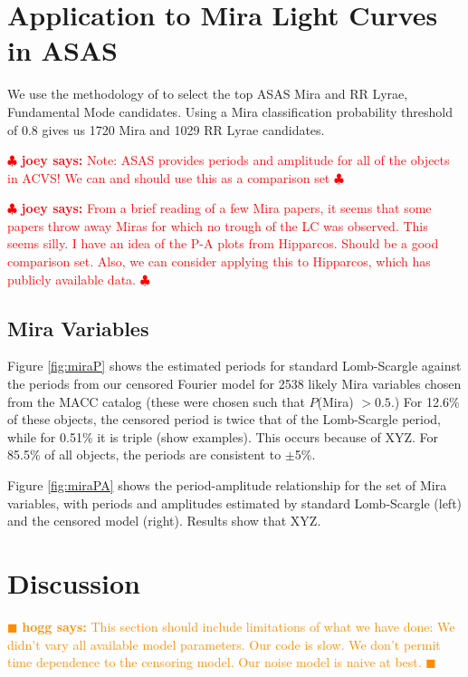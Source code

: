 \documentclass[12pt,preprint]{aastex}
\newcommand{\hogg}[1] { \textcolor{darkorange} {
\ensuremath{\blacksquare} {\bf hogg says:}  {#1}
\ensuremath{\blacksquare} } }
\newcommand{\joey}[1] { \textcolor{red} {
\ensuremath{\clubsuit} {\bf joey says:}  {#1}
\ensuremath{\clubsuit} } }%
\begin{document}
\section{Application to Mira Light Curves in ASAS}
\label{sec:results}

We use the methodology of \cite{2011arXiv1106.2832R} to select the top ASAS Mira  and RR Lyrae, Fundamental Mode candidates.  Using a Mira classification probability threshold of 0.8 gives us 1720 Mira  and 1029 RR Lyrae candidates.

\joey{Note: ASAS provides periods and amplitude for all of the objects in ACVS!  We can and should use this as a comparison set}

\joey{From a brief reading of a few Mira papers, it seems that some papers throw away Miras for which no trough of the LC was observed.  This seems silly.  I have an idea of the P-A plots from Hipparcos.  Should be a good comparison set.  Also, we can consider applying this to Hipparcos, which has publicly available data.}


 \subsection{Mira Variables}

Figure \ref{fig:miraP} shows the estimated periods for standard Lomb-Scargle against the periods from our censored Fourier model for 2538 likely Mira variables chosen from the MACC catalog (these were chosen such that $P$(Mira) $>0.5$.)  For 12.6\% of these objects, the censored period is twice that of the Lomb-Scargle period, while for 0.51\% it is triple (show examples).  This occurs because of XYZ.  For 85.5\% of all objects, the periods are consistent to $\pm$5\%.



Figure \ref{fig:miraPA} shows the period-amplitude relationship for the set of Mira variables, with periods and amplitudes estimated by standard Lomb-Scargle (left) and the censored model (right).  Results show that XYZ.
 




\section{Discussion}
\label{sec:discussion}

\hogg{This section should include limitations of what we have done:  We didn't vary all available model parameters.  Our code is slow.  We don't permit time dependence to the censoring model.  Our noise model is naive at best.}
\end{document}
